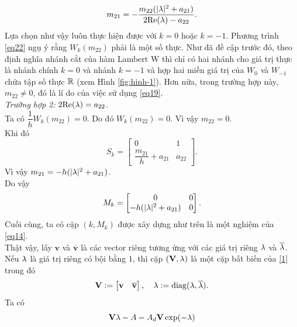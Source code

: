 \begin{cm}
\begin{equation}\label{eq23}
	m_{21} = -\dfrac{m_{22}(\vert \lambda \vert ^2 +a_{21})}{2\mathrm{Re}(\lambda)-a_{22}}.
\end{equation}
Lựa chọn như vậy luôn thực hiện được với $k = 0$ hoặc $k = -1$. Phương trình \eqref{eq22} ngụ ý rằng $W_k(m_{22})$ phải là một số thực. Như đã đề cập trước đó, theo định nghĩa nhánh cắt của hàm Lambert W thì chỉ có hai nhánh cho giá trị thực là nhánh chính $k = 0$ và nhánh $k = -1$ và hợp hai miền giá trị của $W_0$ và $W_{-1}$ chứa tập số thực $\mathbb{R}$ (xem Hình \ref{fig:hinh-1}). Hơn nữa, trong trường hợp này, $m_{22} \ne 0$, đó là lí do của việc sử dụng \eqref{eq19}.\\
\noindent\textit{Trường hợp 2:} $2\mathrm{Re}(\lambda) = a_{22}$.\\
Ta có $\dfrac{1}{h } W_k(m_{22}) = 0$. Do đó $W_k(m_{22}) =0$. Vì vậy $m_{22}=0$.\\
Khi đó
\begin{equation*}
S_k = \begin{bmatrix}
	0 &1\\
	\dfrac{m_{21}}{h } +a_{21} & a_{22}
\end{bmatrix}.
\end{equation*}
Vì vậy $m_{21} = - h (\vert \lambda \vert ^2 + a_{21})$.\\
Do vậy
\begin{equation}\label{eq24}
	M_k = \begin{bmatrix}
		0 &0\\
		- h (\vert \lambda \vert ^2 + a_{21}) & 0
	\end{bmatrix}.
\end{equation} 
Cuối cùng, ta có cặp $(k, M_k)$ được xây dựng như trên là một nghiệm của \eqref{eq14}.\\
Thật vậy, lấy $\mathbf{v}$ và  $\mathbf{\overline{v}}$ là các vector riêng tương ứng với các giá trị riêng $\lambda$ và $\overline{\lambda}$. Nếu $\lambda$ là giá trị riêng có bội bằng $1$, thì cặp $(\mathbf{V}, \mathbf{\lambda})$ là một cặp bất biến của \eqref{1} trong đó
\begin{equation}\label{eq25}
	\mathbf{V} := \begin{bmatrix}
		\mathbf{v} &\mathbf{\overline{v}}
	\end{bmatrix},
	\quad 
	\mathbf{\lambda} := \mathrm{diag} (\lambda, \overline{\lambda}).
\end{equation}
Ta có
\begin{align}\label{100}
	&\mathbf{V} \mathbf{\lb} - A - A_d \mathbf{V} \exp (-\mathbf{\lb})\\ \notag

\end{align}
\end{cm}
